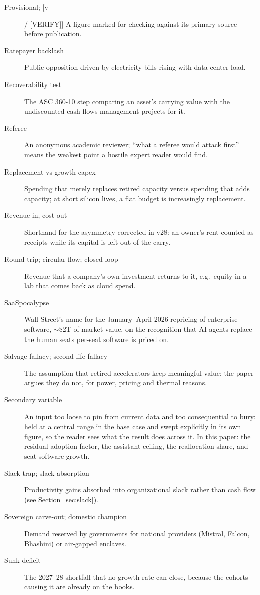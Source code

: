 \documentclass[11pt,letterpaper]{article}
\begin{document}
\begin{description}
\item[Provisional; [v] / [VERIFY]] A figure marked for checking against its primary source before publication.
\item[Ratepayer backlash] Public opposition driven by electricity bills rising with data-center load.
\item[Recoverability test] The ASC 360-10 step comparing an asset's carrying value with the undiscounted cash flows management projects for it.
\item[Referee] An anonymous academic reviewer; ``what a referee would attack first'' means the weakest point a hostile expert reader would find.
\item[Replacement vs growth capex] Spending that merely replaces retired capacity versus spending that adds capacity; at short silicon lives, a flat budget is increasingly replacement.
\item[Revenue in, cost out] Shorthand for the asymmetry corrected in v28: an owner's rent counted as receipts while its capital is left out of the carry.
\item[Round trip; circular flow; closed loop] Revenue that a company's own investment returns to it, e.g.\ equity in a lab that comes back as cloud spend.
\item[SaaSpocalypse] Wall Street's name for the January--April 2026 repricing of enterprise software, $\sim$\$2T of market value, on the recognition that AI agents replace the human seats per-seat software is priced on.
\item[Salvage fallacy; second-life fallacy] The assumption that retired accelerators keep meaningful value; the paper argues they do not, for power, pricing and thermal reasons.
\item[Secondary variable] An input too loose to pin from current data and too consequential to bury: held at a central range in the base case and swept explicitly in its own figure, so the reader sees what the result does across it. In this paper: the residual adoption factor, the assistant ceiling, the reallocation share, and seat-software growth.
\item[Slack trap; slack absorption] Productivity gains absorbed into organizational slack rather than cash flow (see Section~\ref{sec:slack}).
\item[Sovereign carve-out; domestic champion] Demand reserved by governments for national providers (Mistral, Falcon, Bhashini) or air-gapped enclaves.
\item[Sunk deficit] The 2027--28 shortfall that no growth rate can close, because the cohorts causing it are already on the books.

\end{description}
\end{document}
